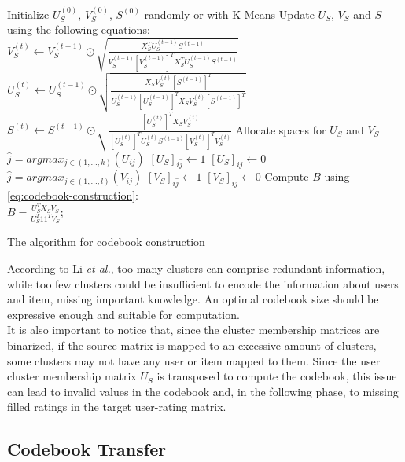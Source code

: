 \begin{algorithm}[H]
Initialize $U_S^{(0)}$, $V_S^{(0)}$, $S^{(0)}$ randomly or with K-Means\;
{
  Update $U_S$, $V_S$ and $S$ using the following equations:\\
  $V_S^{(t)} \gets V_S^{(t - 1)} \odot \sqrt{\frac{X_S^T U_S^{(t - 1)} S^{(t - 1)}}{V_S^{(t - 1)} [V_S^{(t - 1)}]^T X_S^T U_S^{(t - 1)} S^{(t - 1)}}}$\;
  $U_S^{(t)} \gets U_S^{(t - 1)} \odot \sqrt{\frac{X_S V_S^{(t)} [S^{(t - 1)}]^T}{U_S^{(t - 1)} [U_S^{(t - 1)}]^T X_S V_S^{(t)} [S^{(t - 1)}]^T}}$\;
  $S^{(t)} \gets S^{(t - 1)} \odot \sqrt{\frac{[U_S^{(t)}]^T X_S V_S^{(t)}}{[U_S^{(t)}]^T U_S^{(t)} S^{(t - 1)} [V_S^{(t)}]^T V_S^{(t)}}}$\;
}
Allocate spaces for $U_S$ and $V_S$\;
{
  $\hat{j} = argmax_{j \in (1,...,k)}(U_{ij})$\;
  $[U_S]_{i\hat{j}} \gets 1$\;
  {
    $[U_S]_{ij} \gets 0$\;
  }
}
{
  $\hat{j} = argmax_{j \in (1,...,l)}(V_{ij})$\;
  $[V_S]_{i\hat{j}} \gets 1$\;
  {
    $[V_S]_{ij} \gets 0$\;
  }
}
Compute $B$ using \autoref{eq:codebook-construction}:\\
$B = \frac{U_S^T X_S V_S}{U_S^T 1 1^T V_S}$;
\caption{The algorithm for codebook construction}
\end{algorithm}
\vskip 0.7cm
According to Li \textit{et al.}, too many clusters can comprise redundant information, while too few clusters could be insufficient to encode the information about users and item, missing important knowledge. An optimal codebook size should be expressive enough and suitable for computation.\\
It is also important to notice that, since the cluster membership matrices are binarized, if the source matrix is mapped to an excessive amount of clusters, some clusters may not have any user or item mapped to them. Since the user cluster membership matrix $U_S$ is transposed to compute the codebook, this issue can lead to invalid values in the codebook and, in the following phase, to missing filled ratings in the target user-rating matrix.


\subsection{Codebook Transfer}
\label{ss:codebook-transfer}

